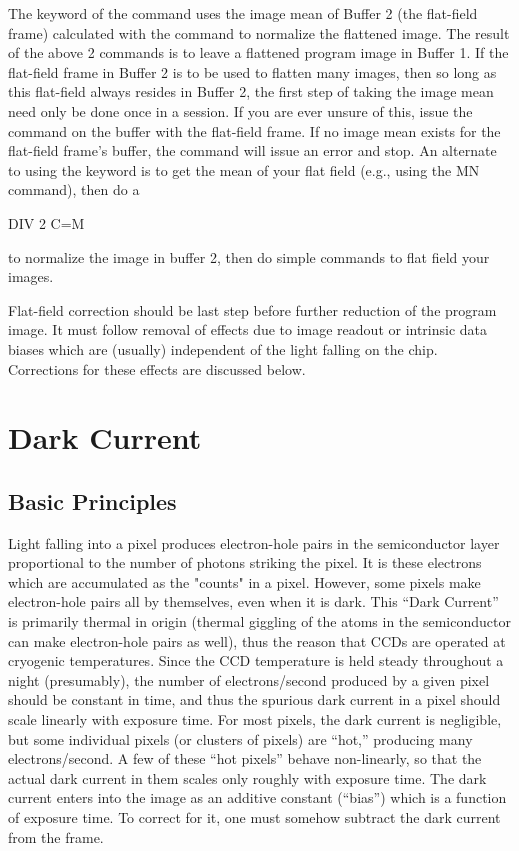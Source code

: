 \noindent
The  keyword of the  command uses the image mean of
Buffer 2 (the flat-field frame) calculated with the  command to
normalize the flattened image.  The result of the above 2 commands is to leave
a flattened program image in Buffer 1.  If the flat-field frame in Buffer 2 is
to be used to flatten many images, then so long as this flat-field always
resides in Buffer 2, the first step of taking the image mean need only be done
once in a session.  If you are ever unsure of this, issue the 
command on the buffer with the flat-field frame. If no image mean exists for
the flat-field frame's buffer, the  command will issue an error and
stop. An alternate to using the  keyword is to get the mean of
your flat field (e.g., using the MN command), then do a

\begin{command}
	\item DIV 2 C=M
\end{command}
to normalize the image in buffer 2, then do simple  commands to
flat field your images.

Flat-field correction should be last step before further reduction of the
program image.  It must follow removal of effects due to image readout or
intrinsic data biases which are (usually) independent of the light falling on
the chip.  Corrections for these effects are discussed below. 


\section{Dark Current}

\subsection{Basic Principles}
\nobreak
Light falling into a pixel produces electron-hole pairs in the semiconductor
layer proportional to the number of photons striking the pixel.  It is these
electrons which are accumulated as the "counts" in a pixel.  However, some
pixels make electron-hole pairs all by themselves, even when it is dark. This
``Dark Current'' is 
primarily thermal in origin (thermal giggling of the atoms in
the semiconductor can make electron-hole pairs as well), thus the reason that
CCDs are operated at cryogenic temperatures.  Since the CCD temperature is
held steady throughout a night (presumably), the number of electrons/second
produced by a given pixel should be constant in time, and thus the spurious
dark current in a pixel should scale linearly with exposure time.  For most
pixels, the dark current is negligible, but some individual pixels (or clusters
of pixels) are ``hot,'' producing many electrons/second.  A few of these ``hot
pixels'' behave non-linearly, so that the actual dark current in them scales only
roughly with exposure time.  The dark current enters into the image as an
additive constant (``bias'') which is a function of exposure time. To correct
for it, one must somehow subtract the dark current from the frame. 

